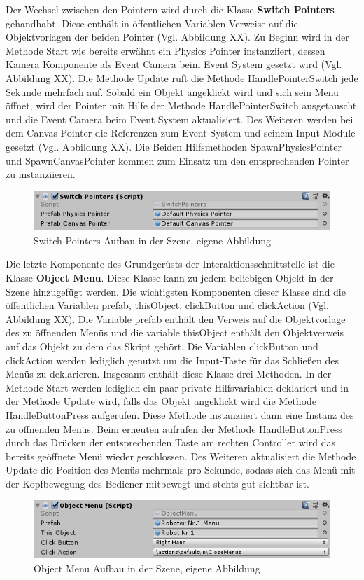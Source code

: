 \newline
Der Wechsel zwischen den Pointern wird durch die Klasse \textbf{Switch Pointers} gehandhabt. Diese enthält in öffentlichen Variablen Verweise auf die Objektvorlagen der beiden Pointer (Vgl. Abbildung XX).
\newline
Zu Beginn wird in der Methode Start wie bereits erwähnt ein Physics Pointer instanziiert, dessen Kamera Komponente als Event Camera beim Event System gesetzt wird (Vgl. Abbildung XX). Die Methode Update ruft die Methode HandlePointerSwitch jede Sekunde mehrfach auf. Sobald ein Objekt angeklickt wird und sich sein Menü öffnet, wird der Pointer mit Hilfe der Methode HandlePointerSwitch ausgetauscht und die Event Camera beim Event System aktualisiert. Des Weiteren werden bei dem Canvas Pointer die Referenzen zum Event System und seinem Input Module gesetzt (Vgl. Abbildung XX). Die Beiden Hilfsmethoden SpawnPhysicsPointer und SpawnCanvasPointer kommen zum Einsatz um den entsprechenden Pointer zu instanziieren.
\begin{figure}[h]
	\centering
	\includegraphics[width=0.5\linewidth]{Bilder/A45_SwitchPointer}
	\caption{Switch Pointers Aufbau in der Szene, eigene Abbildung}
	\label{fig:SwitchPointer}
\end{figure}
\newline
Die letzte Komponente des Grundgerüsts der Interaktionsschnittstelle ist die Klasse \textbf{Object Menu}. Diese Klasse kann zu jedem beliebigen Objekt in der Szene hinzugefügt werden. Die wichtigsten Komponenten dieser Klasse sind die öffentlichen Variablen prefab, thisObject, clickButton und clickAction (Vgl. Abbildung XX). Die Variable prefab enthält den Verweis auf die Objektvorlage des zu öffnenden Menüs und die variable thisObject enthält den Objektverweis auf das Objekt zu dem das Skript gehört. Die Variablen clickButton und clickAction werden lediglich genutzt um die Input-Taste für das Schließen des Menüs zu deklarieren.
\newline
Insgesamt enthält diese Klasse drei Methoden. In der Methode Start werden lediglich ein paar private Hilfsvariablen deklariert und in der Methode Update wird, falls das Objekt angeklickt wird die Methode HandleButtonPress aufgerufen. Diese Methode instanziiert dann eine Instanz des zu öffnenden Menüs. Beim erneuten aufrufen der Methode HandleButtonPress durch das Drücken der entsprechenden Taste am rechten Controller wird das bereits geöffnete Menü wieder geschlossen. Des Weiteren aktualisiert die Methode Update die Position des Menüs mehrmals pro Sekunde, sodass sich das Menü mit der Kopfbewegung des Bediener mitbewegt und stehts gut sichtbar ist.
\begin{figure}[h]
	\centering
	\includegraphics[width=0.5\linewidth]{Bilder/A46_ObjectMenu}
	\caption{Object Menu Aufbau in der Szene, eigene Abbildung}
	\label{fig:ObjectMenu}
\end{figure}